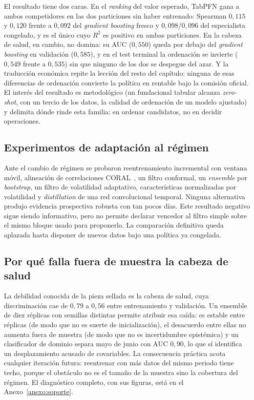 El resultado tiene dos caras. En el \emph{ranking} del valor esperado, TabPFN gana a
ambos competidores en las dos particiones sin haber entrenado: Spearman $0{,}115$ y
$0{,}120$ frente a $0{,}092$ del \emph{gradient boosting} fresco y $0{,}098$/$0{,}096$
del especialista congelado, y es el único cuyo $R^2$ es positivo en ambas particiones. En
la cabeza de salud, en cambio, no domina: su AUC ($0{,}550$) queda por debajo del
\emph{gradient boosting} en validación ($0{,}585$), y en el test terminal la ordenación se
invierte ($0{,}549$ frente a $0{,}535$) sin que ninguno de los dos se despegue del azar. Y la
traducción económica repite la lección del resto del capítulo: ninguna de esas
diferencias de ordenación convierte la política en rentable bajo la comisión oficial. El
interés del resultado es metodológico (un fundacional tabular alcanza \emph{zero-shot},
con un tercio de los datos, la calidad de ordenación de un modelo ajustado) y delimita
dónde rinde esta familia: en ordenar candidatos, no en decidir operaciones.

\subsection{Experimentos de adaptación al régimen}

Ante el cambio de régimen se probaron reentrenamiento incremental con ventana móvil,
alineación de correlaciones CORAL~\cite{sun2016coral}, un filtro conformal, un
\emph{ensemble} por \emph{bootstrap}, un filtro de volatilidad adaptativo, características
normalizadas por volatilidad y \emph{distillation} de una red convolucional temporal.
Ninguna alternativa produjo evidencia prospectiva robusta con tan pocos días. Este resultado
negativo sigue siendo informativo, pero no permite declarar vencedor al filtro simple sobre
el mismo bloque usado para proponerlo. La comparación definitiva queda aplazada hasta disponer
de nuevos datos bajo una política ya congelada.

\subsection{Por qué falla fuera de muestra la cabeza de salud}
\label{sec::n3_diagnostico}

La debilidad conocida de la pieza sellada es la cabeza de salud, cuya discriminación cae
de $0{,}79$ a $0{,}56$ entre entrenamiento y validación. Un ensemble de diez réplicas con
semillas distintas permite atribuir esa caída: es estable entre réplicas (de modo que no
es suerte de inicialización), el desacuerdo entre ellas no aumenta fuera de muestra (de
modo que no es incertidumbre epistémica) y un clasificador de dominio separa mayo de junio
con AUC $0{,}90$, lo que sí identifica un desplazamiento acusado de covariables. La
consecuencia práctica acota cualquier iteración futura: reentrenar con más datos del mismo
periodo tiene techo, porque el obstáculo no es el tamaño de la muestra sino la cobertura
del régimen. El diagnóstico completo, con sus figuras, está en el Anexo~\ref{anexo:soporte}.

